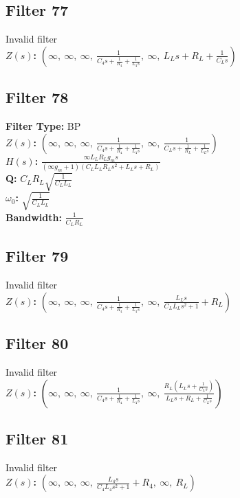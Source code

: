 \documentclass{article}
\begin{document}
\subsection*{Filter 77}
Invalid filter \\ 
\textbf{$Z(s)$:} $\left( \infty, \  \infty, \  \infty, \  \frac{1}{C_{4} s + \frac{1}{R_{4}} + \frac{1}{L_{4} s}}, \  \infty, \  L_{L} s + R_{L} + \frac{1}{C_{L} s}\right)$ \\ 
\subsection*{Filter 78}
\textbf{Filter Type:} BP \\ 
\textbf{$Z(s)$:} $\left( \infty, \  \infty, \  \infty, \  \frac{1}{C_{4} s + \frac{1}{R_{4}} + \frac{1}{L_{4} s}}, \  \infty, \  \frac{1}{C_{L} s + \frac{1}{R_{L}} + \frac{1}{L_{L} s}}\right)$ \\ 
\textbf{$H(s)$:} $\frac{\infty L_{L} R_{L} g_{m} s}{\left(\infty g_{m} + 1\right) \left(C_{L} L_{L} R_{L} s^{2} + L_{L} s + R_{L}\right)}$ \\ 
\textbf{Q:} $C_{L} R_{L} \sqrt{\frac{1}{C_{L} L_{L}}}$ \\ 
\textbf{$\omega_0$:} $\sqrt{\frac{1}{C_{L} L_{L}}}$ \\ 
\textbf{Bandwidth:} $\frac{1}{C_{L} R_{L}}$ \\ 
\subsection*{Filter 79}
Invalid filter \\ 
\textbf{$Z(s)$:} $\left( \infty, \  \infty, \  \infty, \  \frac{1}{C_{4} s + \frac{1}{R_{4}} + \frac{1}{L_{4} s}}, \  \infty, \  \frac{L_{L} s}{C_{L} L_{L} s^{2} + 1} + R_{L}\right)$ \\ 
\subsection*{Filter 80}
Invalid filter \\ 
\textbf{$Z(s)$:} $\left( \infty, \  \infty, \  \infty, \  \frac{1}{C_{4} s + \frac{1}{R_{4}} + \frac{1}{L_{4} s}}, \  \infty, \  \frac{R_{L} \left(L_{L} s + \frac{1}{C_{L} s}\right)}{L_{L} s + R_{L} + \frac{1}{C_{L} s}}\right)$ \\ 
\subsection*{Filter 81}
Invalid filter \\ 
\textbf{$Z(s)$:} $\left( \infty, \  \infty, \  \infty, \  \frac{L_{4} s}{C_{4} L_{4} s^{2} + 1} + R_{4}, \  \infty, \  R_{L}\right)$ \\ 
\end{document}
